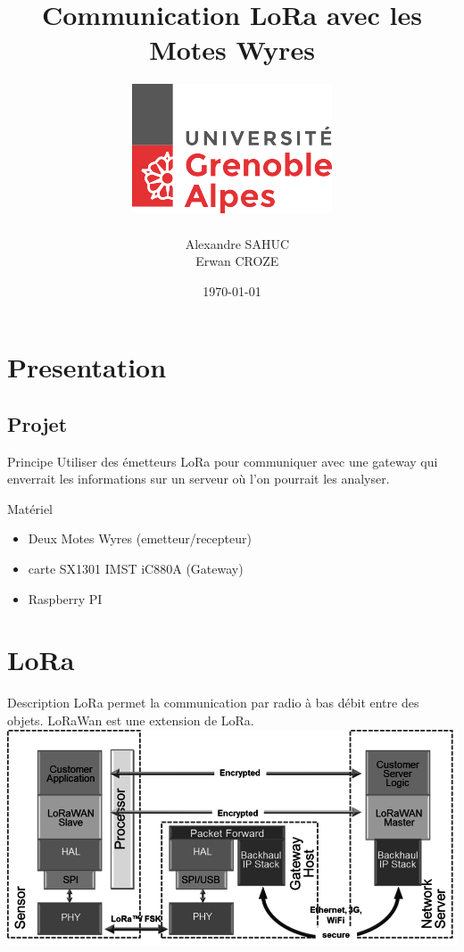 \documentclass{beamer}
\title{Communication LoRa avec les Motes Wyres}
\author{\includegraphics[scale=0.3]{univ.png} \\~ \\ ~ Alexandre SAHUC\\~ Erwan CROZE}
\institute{Université Joseph Fourier \newline M2M}
\date{\today}
\begin{document}
\begin{frame}
	\titlepage
\end{frame}

\section{Presentation}
\subsection{Projet}
\begin{frame}
  	\begin{block}{Principe}
  		Utiliser des émetteurs LoRa pour communiquer avec une gateway qui enverrait les informations sur un serveur où l'on pourrait les analyser.
	\end{block}
	
	\begin{exampleblock}{Matériel}
		\begin{itemize}
			\item Deux Motes Wyres (emetteur/recepteur)
			\item carte SX1301 IMST iC880A (Gateway)
			\item Raspberry PI 
		\end{itemize}
	\end{exampleblock}
\end{frame}

\section{LoRa}
\begin{frame}
	\begin{block}{Description}
		LoRa permet la communication par radio à bas débit entre des objets.
		LoRaWan est une extension de LoRa.
		\center
		\includegraphics[scale=0.5]{LoRa-network.png}
	\end{block}
\end{frame}
\end{document}
